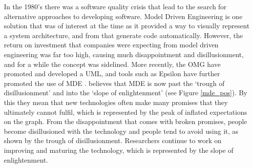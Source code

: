 In the 1980's there was a software quality crisis that lead to the search for alternative approaches to developing software. Model Driven Engineering is one solution that was of interest at the time as it provided a way to visually represent a system architecture, and from that generate code automatically. However, the return on investment that companies were expecting from model driven engineering was far too high, causing much disappointment and disillusionment, and for a while the concept was sidelined. More recently, the \ac{OMG} have promoted and developed a \ac{UML}, and tools such as Epsilon have further promoted the use of \ac{MDE} \citep{mdeHistory}.  \citet{brambillaBook} believes that \ac{MDE} is now past the `trough of disillusionment' and into the `slope of enlightenment' (see Figure \ref{mde_pos}). By this they mean that new technologies often make many promises that they ultimately cannot fulfil, which is represented by the peak of inflated expectations on the graph. From the disappointment that comes with broken promises, people become disillusioned with the technology and people tend to avoid using it, as shown by the trough of disillusionment. Researchers continue to work on improving and maturing the technology, which is represented by the slope of enlightenment. \\


